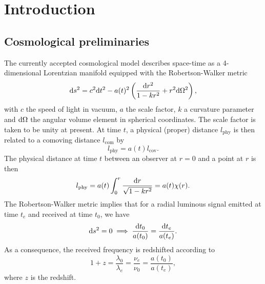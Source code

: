 \chapter{Introduction}\label{chapter:intro}


\section{Cosmological preliminaries}
The currently accepted cosmological model describes space-time as a 4-dimensional Lorentzian manifold equipped with the Robertson-Walker metric \cite{carroll}
\begin{equation}\label{eq_ch1:RW_metric}
    \differential s^2=c^2\differential t^2-a(t)^2\left( \frac{\differential r^2}{1-kr^2}+r^2 \differential \Omega^2 \right),
\end{equation}
with $c$ the speed of light in vacuum, $a$ the scale factor, $k$ a curvature parameter and  $\differential \Omega$ the angular volume element in spherical coordinates. The scale factor is taken to be unity at present. At time $t$, a physical (proper) distance $l_\text{phy}$ is then related to a comoving distance $l_\text{com}$ by 
\begin{equation}\label{eq_ch1:phy_com_dis}
    l_\text{phy}=a(t)l_\text{cov}.
\end{equation}
The physical distance at time $t$ between an observer at $r=0$ and a point at $r$ is then
\begin{equation}\label{eq_ch1:def_com_len}
    l_\text{phy}=a(t)\int_0^r \frac{\differential r}{\sqrt{1-kr^2}}=a(t)\chi(r).
\end{equation}
The Robertson-Walker metric implies that for a radial luminous signal emitted at time $t_e$ and received at time $t_0$, we have
\begin{equation}
    \differential s^2=0 \implies \frac{\differential t_0}{a(t_0)}=\frac{\differential t_e}{a(t_e)}.
\end{equation}
As a consequence, the received frequency is redshifted according to
\begin{equation}
    1+z=\frac{\lambda_0}{\lambda_e}=\frac{\nu_e}{\nu_0}=\frac{a(t_0)}{a(t_e)},
\end{equation}
where $z$ is the redshift.

